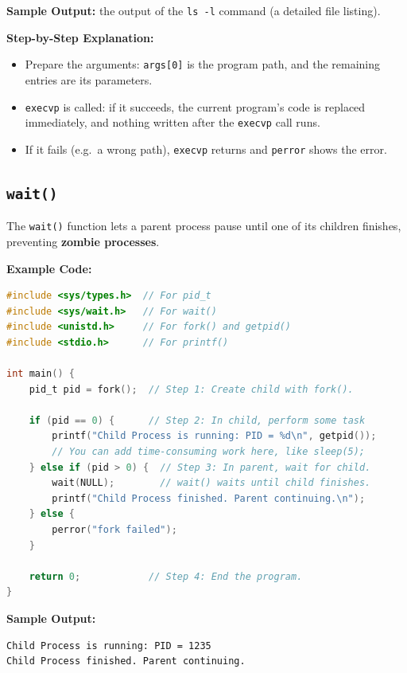 \textbf{Sample Output:} the output of the \texttt{ls -l} command (a detailed file listing). %

\textbf{Step-by-Step Explanation:} %
\begin{itemize}
    \item Prepare the arguments: \texttt{args[0]} is the program path, and the remaining entries are its parameters. %
    \item \texttt{execvp} is called: if it succeeds, the current program's code is replaced immediately, and nothing written after the \texttt{execvp} call runs. %
    \item If it fails (e.g.\ a wrong path), \texttt{execvp} returns and \texttt{perror} shows the error. %
\end{itemize}

\subsection{\texttt{wait()}} %
The \texttt{wait()} function lets a parent process pause until one of its children finishes, preventing \textbf{zombie processes}. %

\textbf{Example Code:} %
\begin{lstlisting}[language=C]
#include <sys/types.h>  // For pid_t
#include <sys/wait.h>   // For wait()
#include <unistd.h>     // For fork() and getpid()
#include <stdio.h>      // For printf()

int main() {
    pid_t pid = fork();  // Step 1: Create child with fork().

    if (pid == 0) {      // Step 2: In child, perform some task
        printf("Child Process is running: PID = %d\n", getpid());
        // You can add time-consuming work here, like sleep(5);
    } else if (pid > 0) {  // Step 3: In parent, wait for child.
        wait(NULL);        // wait() waits until child finishes.
        printf("Child Process finished. Parent continuing.\n");
    } else {
        perror("fork failed");
    }

    return 0;            // Step 4: End the program.
}
\end{lstlisting} %

\textbf{Sample Output:} %
\begin{lstlisting}[language=Terminal]
Child Process is running: PID = 1235
Child Process finished. Parent continuing.
\end{lstlisting} %

